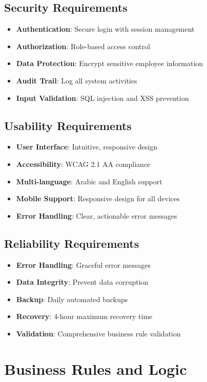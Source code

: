 \documentclass[12pt,a4paper]{article}
\begin{document}
\subsection{Security Requirements}
\begin{itemize}
    \item \textbf{Authentication}: Secure login with session management
    \item \textbf{Authorization}: Role-based access control
    \item \textbf{Data Protection}: Encrypt sensitive employee information
    \item \textbf{Audit Trail}: Log all system activities
    \item \textbf{Input Validation}: SQL injection and XSS prevention
\end{itemize}

\subsection{Usability Requirements}
\begin{itemize}
    \item \textbf{User Interface}: Intuitive, responsive design
    \item \textbf{Accessibility}: WCAG 2.1 AA compliance
    \item \textbf{Multi-language}: Arabic and English support
    \item \textbf{Mobile Support}: Responsive design for all devices
    \item \textbf{Error Handling}: Clear, actionable error messages
\end{itemize}

\subsection{Reliability Requirements}
\begin{itemize}
    \item \textbf{Error Handling}: Graceful error messages
    \item \textbf{Data Integrity}: Prevent data corruption
    \item \textbf{Backup}: Daily automated backups
    \item \textbf{Recovery}: 4-hour maximum recovery time
    \item \textbf{Validation}: Comprehensive business rule validation
\end{itemize}

\section{Business Rules and Logic}
\end{document}
